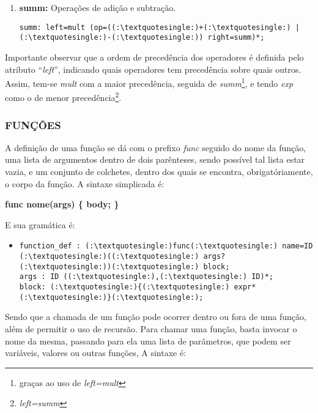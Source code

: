 \begin{itemize}
\begin{enumerate}
                \item \textbf{summ:} Operações de adição e subtração.
                    \begin{lstlisting}
summ: left=mult (op=((:\textquotesingle:)+(:\textquotesingle:) | (:\textquotesingle:)-(:\textquotesingle:)) right=summ)*;
                    \end{lstlisting}
            \end{enumerate}

            Importante observar que a ordem de precedência dos operadores é definida pelo atributo ``\textit{left}'', indicando quais operadores tem precedência sobre quais outros. Assim, tem-se \textit{mult} com a maior precedência, seguida de \textit{summ}\footnote{graças ao uso de \textit{left=mult}}, e tendo \textit{exp} como o de menor precedência\footnote{\textit{left=summ}}.

        \subsubsection{\normalsize FUNÇÕES}
            A definição de uma função se dá com o prefixo \textit{func} seguido do nome da função, uma lista de argumentos dentro de dois parênteses, sendo possível tal lista estar vazia, e um conjunto de colchetes, dentro dos quais se encontra, obrigatóriamente, o corpo da função. A sintaxe simplicada é:

            \textbf{func nome(args) \{
                body;
            \}}

            E sua gramática é:
            \begin{itemize}
            \item[ ]
            \begin{lstlisting}
function_def : (:\textquotesingle:)func(:\textquotesingle:) name=ID (:\textquotesingle:)((:\textquotesingle:) args? (:\textquotesingle:))(:\textquotesingle:) block;
args : ID ((:\textquotesingle:),(:\textquotesingle:) ID)*;
block: (:\textquotesingle:){(:\textquotesingle:) expr* (:\textquotesingle:)}(:\textquotesingle:);            
            \end{lstlisting}
            \end{itemize}

            Sendo que a chamada de um função pode ocorrer dentro ou fora de uma função, além de permitir o uso de recursão. Para chamar uma função, basta invocar o nome da mesma, passando para ela uma lista de parâmetros, que podem ser variáveis, valores ou outras funções, A sintaxe é:


\end{itemize}
